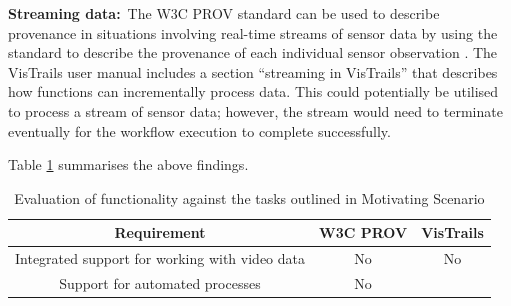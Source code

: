 {}

\textbf{Streaming data:}{~The W3C PROV standard can be used to describe
provenance in situations involving real-time streams of sensor data by
using the standard to describe the provenance of each individual sensor
observation \cite{Compton2014}. The VisTrails user manual includes a
section ``streaming in VisTrails'' that describes how functions can
incrementally process data. This could potentially be utilised to
process a stream of sensor data; however, the stream would need to
terminate eventually for the workflow execution to complete
successfully.}

{}

{Table \ref{EvalFunctionality} summarises the above findings.}

\begin{table}[H]
  \caption{Evaluation of functionality against the
tasks outlined in Motivating Scenario}
  \label{EvalFunctionality}
\begin{minipage}{\columnwidth}
\begin{tabular}{ccc}
\toprule
\begin{minipage}[t]{0.30\columnwidth}\raggedright\strut
{\textbf{Requirement}}
\strut\end{minipage} &
\begin{minipage}[t]{0.30\columnwidth}\raggedright\strut
{\textbf{W3C PROV\footnotemark}}
\strut\end{minipage} &
\begin{minipage}[t]{0.30\columnwidth}\raggedright\strut
{\textbf{VisTrails}}
\strut\end{minipage}\tabularnewline
\midrule
\begin{minipage}[t]{0.30\columnwidth}\raggedright\strut
{Integrated support for working with video data}
\strut\end{minipage} &
\begin{minipage}[t]{0.30\columnwidth}\raggedright\strut
{No\footnotemark}
\strut\end{minipage} &
\begin{minipage}[t]{0.30\columnwidth}\raggedright\strut
{No\footnotemark[\value{footnote}]}
\strut\end{minipage}\tabularnewline
\midrule
\begin{minipage}[t]{0.30\columnwidth}\raggedright\strut
{Support for automated processes}
\strut\end{minipage} &
\begin{minipage}[t]{0.30\columnwidth}\raggedright\strut
{No\footnotemark[\value{footnote}]}

\end{minipage}
\end{tabular}
\end{minipage}
\end{table}
